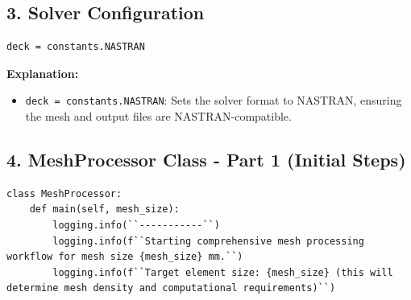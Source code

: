 \documentclass{book}
\begin{document}
\begin{itemize}[leftmargin=*,label=\textbullet]
\subsection*{3. Solver Configuration}
\begin{lstlisting}[caption={Solver Configuration},label={lst:solver}]
deck = constants.NASTRAN
\end{lstlisting}
\textbf{Explanation:}
\begin{itemize}
    \item \texttt{deck = constants.NASTRAN}: Sets the solver format to NASTRAN, ensuring the mesh and output files are NASTRAN-compatible.
\end{itemize}

\subsection*{4. MeshProcessor Class - Part 1 (Initial Steps)}
\begin{lstlisting}[caption={MeshProcessor Class - Initial Steps},label={lst:meshprocessor_1}]
class MeshProcessor:
    def main(self, mesh_size):
        logging.info(``-----------``)
        logging.info(f``Starting comprehensive mesh processing workflow for mesh size {mesh_size} mm.``)
        logging.info(f``Target element size: {mesh_size} (this will determine mesh density and computational requirements)``)


\end{lstlisting}
\end{itemize}
\end{document}
